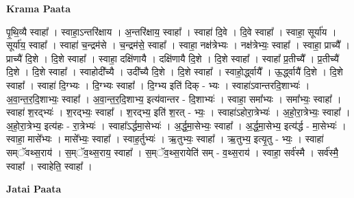 \documentclass[17pt]{extarticle}
\begin{document}
\textbf{Krama Paata} \newline

पृ॒थि॒व्यै स्वाहा᳚ । स्वाहा॒ऽन्तरि॑क्षाय । अ॒न्तरि॑क्षाय॒ स्वाहा᳚ । स्वाहा॑ दि॒वे । दि॒वे स्वाहा᳚ । स्वाहा॒ सूर्या॑य । सूर्या॑य॒ स्वाहा᳚ । स्वाहा॑ च॒न्द्रम॑से । च॒न्द्रम॑से॒ स्वाहा᳚ । स्वाहा॒ नक्ष॑त्रेभ्यः । नक्ष॑त्रेभ्यः॒ स्वाहा᳚ । स्वाहा॒ प्राच्यै᳚ । प्राच्यै॑ दि॒शे । दि॒शे स्वाहा᳚ । स्वाहा॒ दक्षि॑णायै । दक्षि॑णायै दि॒शे । दि॒शे स्वाहा᳚ । स्वाहा᳚ प्र॒तीच्यै᳚ । प्र॒तीच्यै॑ दि॒शे । दि॒शे स्वाहा᳚ । स्वाहोदी᳚च्यै । उदी᳚च्यै दि॒शे । दि॒शे स्वाहा᳚ । स्वाहो॒र्द्ध्वायै᳚ । ऊ॒र्द्ध्वायै॑ दि॒शे । दि॒शे स्वाहा᳚ । स्वाहा॑ दि॒ग्भ्यः । दि॒ग्भ्यः स्वाहा᳚ । दि॒ग्भ्य इति॑ दिक् - भ्यः । स्वाहा॑ऽवान्तरदि॒शाभ्यः॑ । अ॒वा॒न्त॒र॒दि॒शाभ्यः॒ स्वाहा᳚ । अ॒वा॒न्त॒र॒दि॒शाभ्य॒ इत्य॑वान्तर - दि॒शाभ्यः॑ । स्वाहा॒ समा᳚भ्यः । समा᳚भ्यः॒ स्वाहा᳚ । स्वाहा॑ श॒रद्भ्यः॑ । श॒रद्भ्यः॒ स्वाहा᳚ । श॒रद्भ्य॒ इति॑ श॒रत् - भ्यः॒ । स्वाहा॑ऽहोरा॒त्रेभ्यः॑ । अ॒हो॒रा॒त्रेभ्यः॒ स्वाहा᳚ । अ॒हो॒रा॒त्रेभ्य॒ इत्य॑हः - रा॒त्रेभ्यः॑ । स्वाहा᳚ऽर्द्धमा॒सेभ्यः॑ । अ॒र्द्ध॒मा॒सेभ्यः॒ स्वाहा᳚ । अ॒र्द्ध॒मा॒सेभ्य॒ इत्य॑र्द्ध - मा॒सेभ्यः॑ । स्वाहा॒ मासे᳚भ्यः । मासे᳚भ्यः॒ स्वाहा᳚ । स्वाह॒र्तुभ्यः॑ । ऋ॒तुभ्यः॒ स्वाहा᳚ । ऋ॒तुभ्य॒ इत्यृ॒तु - भ्यः॒ । स्वाहा॑ सम्ॅवथ्स॒राय॑ । स॒म्ॅव॒थ्स॒राय॒ स्वाहा᳚ । स॒म्ॅव॒थ्स॒रायेति॑ सम् - व॒थ्स॒राय॑ । स्वाहा॒ सर्व॑स्मै । सर्व॑स्मै॒ स्वाहा᳚ । स्वाहेति॒ स्वाहा᳚ । \newline

\textbf{Jatai Paata} \newline
\end{document}
